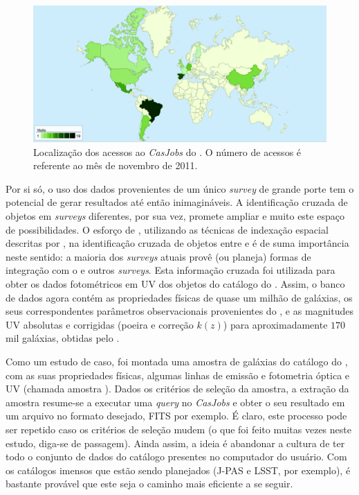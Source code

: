 \begin{figure}
	\includegraphics[width=\textwidth]{figuras/starlight-analytics.eps}
	\caption[Localização dos acessos ao {\em CasJobs} do \starlight.]
	{Localização dos acessos ao {\em CasJobs} do \starlight. O número de acessos é
	referente ao mês de novembro de 2011.}	
	\label{fig:AcessosStarlight}
\end{figure}

Por si só, o uso dos dados provenientes de um único {\em survey} de grande porte
tem o potencial de gerar resultados até então inimagináveis. A identificação
cruzada de objetos em {\em surveys} diferentes, por sua vez, promete ampliar e
muito este espaço de possibilidades. O esforço de \citet{Budavari2009},
utilizando as técnicas de indexação espacial descritas por \citet{Kunszt2001},
na identificação cruzada de objetos entre \SDSS e \galex é de suma importância
neste sentido: a maioria dos {\em surveys} atuais provê (ou planeja) formas de
integração com o \SDSS e outros {\em surveys}. Esta informação cruzada foi
utilizada para obter os dados fotométricos em UV dos objetos do catálogo do
\starlight. Assim, o banco de dados agora contém as propriedades físicas de
quase um milhão de galáxias, os seus correspondentes parâmetros observacionais
provenientes do \SDSS, e as magnitudes UV absolutas e corrigidas (poeira e
correção $k(z)$) para aproximadamente $170$ mil galáxias, obtidas pelo \galex.

Como um estudo de caso, foi montada uma amostra de galáxias do catálogo do
\starlight, com as suas propriedades físicas, algumas linhas de emissão e
fotometria óptica e UV (chamada amostra \starlightUV). Dados os critérios de
seleção da amostra, a extração da amostra resume-se a executar uma {\em query}
no {\em CasJobs} e obter o seu resultado em um arquivo no formato desejado, FITS
por exemplo. É claro, este processo pode ser repetido caso os critérios de
seleção mudem (o que foi feito muitas vezes neste estudo, diga-se de passagem).
Ainda assim, a ideia é abandonar a cultura de ter todo o conjunto de dados do
catálogo presentes no computador do usuário. Com os catálogos imensos que estão
sendo planejados (J-PAS e LSST, por exemplo), é bastante provável que este seja
o caminho mais eficiente a se seguir.

